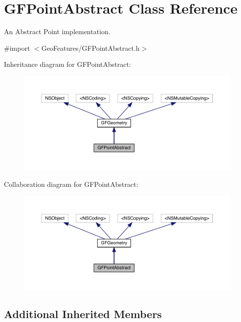 \hypertarget{interface_g_f_point_abstract}{}\section{G\+F\+Point\+Abstract Class Reference}
\label{interface_g_f_point_abstract}


An Abstract Point implementation.  




{\ttfamily \#import $<$Geo\+Features/\+G\+F\+Point\+Abstract.\+h$>$}



Inheritance diagram for G\+F\+Point\+Abstract\+:
\nopagebreak
\begin{figure}[H]
\begin{center}
\leavevmode
\includegraphics[width=350pt]{interface_g_f_point_abstract__inherit__graph}
\end{center}
\end{figure}


Collaboration diagram for G\+F\+Point\+Abstract\+:
\nopagebreak
\begin{figure}[H]
\begin{center}
\leavevmode
\includegraphics[width=350pt]{interface_g_f_point_abstract__coll__graph}
\end{center}
\end{figure}
\subsection*{Additional Inherited Members}


